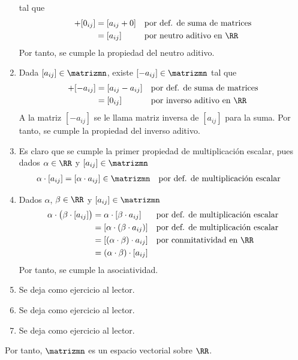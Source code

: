 \begin{theorem}{}{}
\begin{enumerate}[label=\roman*), topsep=6pt, itemsep=0pt]
        tal que
        \begin{align*}
            [ a_{ij} ] + [ 0_{ij} ] & = [ a_{ij} + 0 ] && \text{por def. de suma de matrices} \\
            & = [ a_{ij} ] && \text{por neutro aditivo en $\RR$}
        \end{align*}
        Por tanto, se cumple la propiedad del neutro aditivo.
        \item Dada $[ a_{ij} ] \in \matrizmn$, existe $[ - a_{ij} ] \in \matrizmn$ tal que
        \begin{align*}
            [ a_{ij} ] + [ - a_{ij} ] & = [ a_{ij} -a_{ij} ] && \text{por def. de suma de matrices} \\
            & = [ 0_{ij} ] && \text{por inverso aditivo en $\RR$}
        \end{align*}
        A la matriz $[ -a_{ij} ]$ se le llama matriz inversa de $[ a_{ij} ]$ para la suma. Por tanto, se cumple la propiedad del inverso aditivo.
        \item Es claro que se cumple la primer propiedad de multiplicación escalar, pues dados $\alpha \in \RR$ y $[ a_{ij} ] \in \matrizmn$
        \begin{align*}
            \alpha \cdot [ a_{ij} ] & = [ \alpha \cdot a_{ij} ] \in \matrizmn && \text{por def. de multiplicación escalar}
        \end{align*}
        \item Dados $\alpha$, $\beta \in \RR$ y $[ a_{ij} ] \in \matrizmn$
        \begin{align*}
            \alpha \cdot \big( \beta \cdot [ a_{ij} ] \big) & = \alpha \cdot [ \beta \cdot a_{ij} ] && \text{por def. de multiplicación escalar} \\
            & = [ \alpha \cdot ( \beta \cdot a_{ij}) ] && \text{por def. de multiplicación escalar} \\
            & = [ (\alpha \cdot \beta) \cdot a_{ij} ] && \text{por conmitatividad en $\RR$} \\
            & = ( \alpha \cdot \beta ) \cdot [ a_{ij} ]
        \end{align*}
        Por tanto, se cumple la asociatividad.
        \item Se deja como ejercicio al lector.
        \item Se deja como ejercicio al lector.
        \item Se deja como ejercicio al lector.
    \end{enumerate}
    Por tanto, $\matrizmn$ es un espacio vectorial sobre $\RR$.
\end{theorem}

